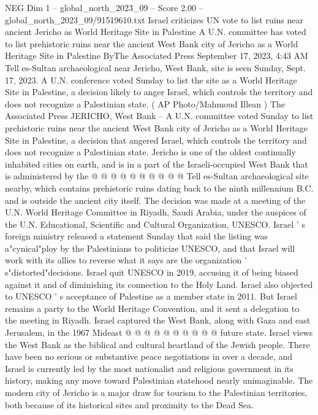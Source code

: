\begin{textsample}{NEG Dim 1 – global\_north\_2023\_09 – Score 2.00 – global\_north\_2023\_09/91519610.txt}  \label{ex:f1_neg_338}
Israel criticizes UN vote to list ruins near ancient Jericho as World Heritage Site in Palestine A U.N. committee has voted to list prehistoric ruins near the ancient West Bank city of Jericho as a World Heritage Site in Palestine ByThe Associated Press September 17, 2023, 4:43 AM Tell es-Sultan archaeological near Jericho, West Bank, site is seen Sunday, Sept. 17, 2023.
A U.N. conference voted Sunday to list the site as a World Heritage Site in Palestine, a decision likely to anger Israel, which controls the territory and does not recognize a Palestinian state. ( AP Photo/Mahmoud Illean ) The Associated Press JERICHO, West Bank -- A U.N. committee voted Sunday to list prehistoric ruins near the ancient West Bank city of Jericho as a World Heritage Site in Palestine, a decision that angered Israel, which controls the territory and does not recognize a Palestinian state.
Jericho is one of the oldest continually inhabited cities on earth, and is in a part of the Israeli-occupied West Bank that is administered by the @ @ @ @ @ @ @ @ @ @ Tell es-Sultan archaeological site nearby, which contains prehistoric ruins dating back to the ninth millennium B.C. and is outside the ancient city itself.
The decision was made at a meeting of the U.N.
World Heritage Committee in Riyadh, Saudi Arabia, under the auspices of the U.N.
Educational, Scientific and Cultural Organization, UNESCO.
Israel ' s foreign ministry released a statement Sunday that said the listing was a"cynical"ploy by the Palestinians to politicize UNESCO, and that Israel will work with its allies to reverse what it says are the organization ' s"distorted"decisions.
Israel quit UNESCO in 2019, accusing it of being biased against it and of diminishing its connection to the Holy Land.
Israel also objected to UNESCO ' s acceptance of Palestine as a member state in 2011.
But Israel remains a party to the World Heritage Convention, and it sent a delegation to the meeting in Riyadh.
Israel captured the West Bank, along with Gaza and east Jerusalem, in the 1967 Mideast @ @ @ @ @ @ @ @ @ @ future state.
Israel views the West Bank as the biblical and cultural heartland of the Jewish people.
There have been no serious or substantive peace negotiations in over a decade, and Israel is currently led by the most nationalist and religious government in its history, making any move toward Palestinian statehood nearly unimaginable.
The modern city of Jericho is a major draw for tourism to the Palestinian territories, both because of its historical sites and proximity to the Dead Sea.

\end{textsample}
